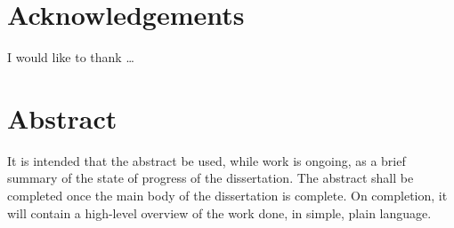 \documentclass[a4paper,12pt,bibtotoc]{book}
\numberwithin{equation}{section}
\numberwithin{figure}{chapter}
\begin{document}
\chapter*{Acknowledgements}

I would like to thank \ldots

\chapter*{Abstract} 
It is intended that the abstract be used, while work is ongoing, as a brief
summary of the state of progress of the dissertation.  The abstract shall be
completed once the main body of the dissertation is complete.  On completion, it
will contain a high-level overview of the work done, in simple, plain language.

 
\mainmatter 

\linespread{1.3} %









\backmatter

\cleardoublepage
\appendix
\addappheadtotoc         %
\noappendicestocpagenum  %
\cleardoublepage

 
\end{document}
